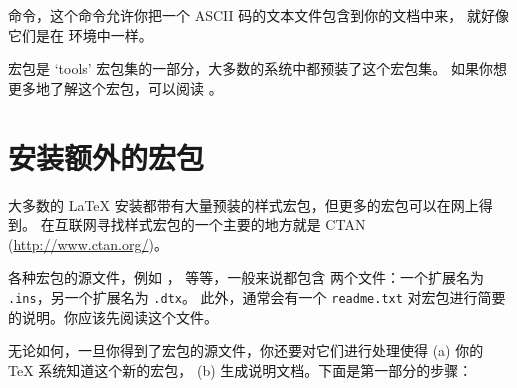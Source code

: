 \noindent
命令，这个命令允许你把一个 ASCII 码的文本文件包含到你的文档中来，
就好像它们是在  环境中一样。


 宏包是 `tools' 宏包集的一部分，大多数的系统中都预装了这个宏包集。
如果你想更多地了解这个宏包，可以阅读 \cite{verbatim}。

\section{安装额外的宏包}\label{sec:Packages}


大多数的 \LaTeX{} 安装都带有大量预装的样式宏包，但更多的宏包可以在网上得到。
在互联网寻找样式宏包的一个主要的地方就是 CTAN
(\url{http://www.ctan.org/})。


各种宏包的源文件，例如 ，  等等，一般来说都包含
两个文件：一个扩展名为 \texttt{.ins}，另一个扩展名为 \texttt{.dtx}。
此外，通常会有一个 \texttt{readme.txt} 对宏包进行简要的说明。你应该先阅读这个文件。


无论如何，一旦你得到了宏包的源文件，你还要对它们进行处理使得 (a) 你的 \TeX{} 系统知道这个新的宏包， (b) 生成说明文档。下面是第一部分的步骤：

